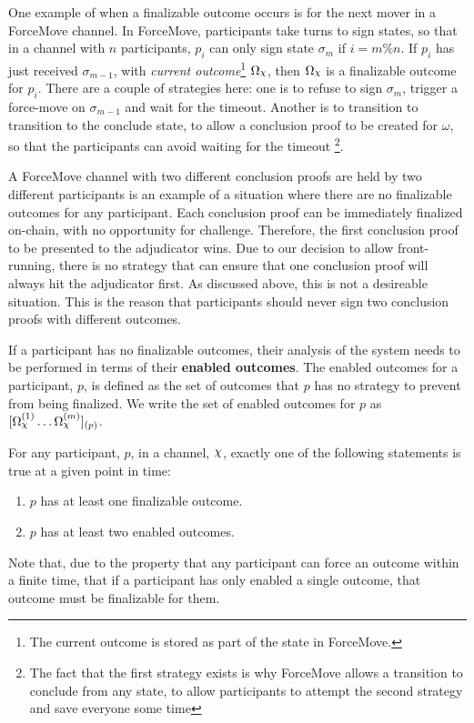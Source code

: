 \documentclass{article}
\begin{document}
\begin{example}
One example of when a finalizable outcome occurs is for the next mover in a ForceMove channel.
In ForceMove, participants take turns to sign states, so that in a channel with $n$ participants,
$p_i$ can only sign state $\sigma_m$ if $i = m \% n$.
If $p_i$ has just received $\sigma_{m-1}$, with \textit{current outcome}\footnote{The current outcome is stored as part of the state in ForceMove.} $\Omega_\rchi$, then $\Omega_\rchi$
is a finalizable outcome for $p_i$.
There are a couple of strategies here: one is to refuse to sign $\sigma_m$, trigger a force-move
on $\sigma_{m-1}$ and wait for the timeout. 
Another is to transition to transition to the conclude state, to allow a conclusion proof
to be created for $\omega$, so that the participants can avoid waiting for the timeout
\footnote{The fact that the first strategy exists is why ForceMove allows a transition to
conclude from any state, to allow participants to attempt the second strategy and save everyone some time}.
\end{example}

\begin{example}
A ForceMove channel with two different conclusion proofs are held by two different participants
is an example of a situation where there are no finalizable outcomes for any participant.
Each conclusion proof can be immediately finalized on-chain, with no opportunity for challenge.
Therefore, the first conclusion proof to be presented to the adjudicator wins. 
Due to our decision to allow front-running, there is no strategy that can ensure that one
conclusion proof will always hit the adjudicator first.
As discussed above, this is not a desireable situation.
This is the reason that participants should never sign two conclusion proofs
with different outcomes.
\end{example}

If a participant has no finalizable outcomes, their analysis of the system needs to be performed
in terms of their \textbf{enabled outcomes}.
The enabled outcomes for a participant, $p$, is defined as the set of outcomes that $p$ has
no strategy to prevent from being finalized.
We write the set of enabled outcomes for $p$ as $\enf{\Omega_\rchi^{(1)} \dots \Omega_\rchi^{(m)}}_{(p)}$.

For any participant, $p$, in a channel, $\rchi$, exactly one of the following statements is
true at a given point in time:
\begin{enumerate}
  \item $p$ has at least one finalizable outcome.
  \item $p$ has at least two enabled outcomes.
\end{enumerate}
Note that, due to the property that any participant can force an outcome within a finite time,
that if a participant has only enabled a single outcome, that outcome must be finalizable for them.
\end{document}
